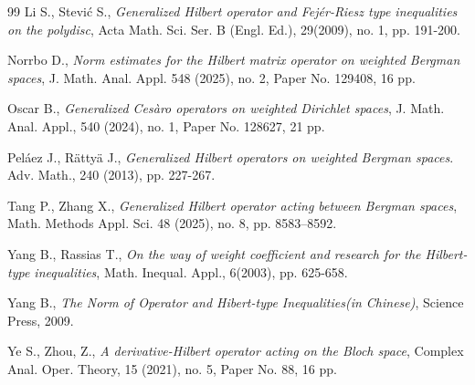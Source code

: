 \documentclass[10pt]{amsart}
\theoremstyle{definition}
\theoremstyle{question}
\numberwithin{equation}{section}
\begin{document}
\begin{thebibliography}{99}
 Li S., Stevi\'{c} S., {\em Generalized Hilbert operator and Fejér-Riesz type inequalities on the polydisc}, Acta Math. Sci. Ser. B (Engl. Ed.),  29(2009),  no. 1,  pp. 191-200.

Norrbo D., {\em Norm estimates for the Hilbert matrix operator on weighted Bergman spaces}, J. Math.
Anal. Appl. 548 (2025), no. 2, Paper No. 129408, 16 pp.




Oscar B., {\em Generalized Cesàro operators on weighted Dirichlet spaces}, J. Math. Anal. Appl., 540 (2024), no. 1, Paper No. 128627, 21 pp.

Pel\'{a}ez J.,  R\"{a}tty\"{a} J., {\em Generalized Hilbert operators on weighted Bergman spaces}. Adv. Math.,  240 (2013),  pp. 227-267.

Tang P., Zhang X., {\em Generalized Hilbert operator acting between Bergman spaces}, Math.
Methods Appl. Sci. 48 (2025), no. 8, pp. 8583–8592.

Yang B., Rassias T., {\em On the way of weight coefficient and research for the Hilbert-type inequalities}, Math. Inequal. Appl., 6(2003), pp. 625-658.

Yang B., {\em The Norm of Operator and Hibert-type Inequalities(in Chinese)}, Science Press, 2009.


Ye S., Zhou, Z., {\em A derivative-Hilbert operator acting on the Bloch space}, Complex Anal. Oper. Theory,  15 (2021), no. 5, Paper No. 88, 16 pp.




\end{thebibliography}
\end{document}
